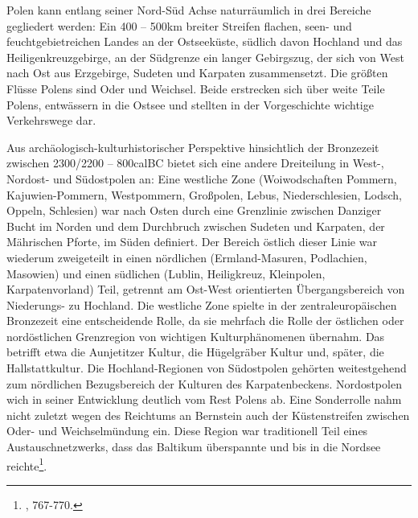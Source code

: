 \documentclass[openany,twoside,twocolumn]{book}
\let\rmarkdownfootnote\footnote%
\def\footnote{\protect\rmarkdownfootnote}
\begin{document}
Polen kann entlang seiner Nord-Süd Achse naturräumlich in drei Bereiche gegliedert werden: Ein 400 -- 500km breiter Streifen flachen, seen- und feuchtgebietreichen Landes an der Ostseeküste, südlich davon Hochland und das Heiligenkreuzgebirge, an der Südgrenze ein langer Gebirgszug, der sich von West nach Ost aus Erzgebirge, Sudeten und Karpaten zusammensetzt. Die größten Flüsse Polens sind Oder und Weichsel. Beide erstrecken sich über weite Teile Polens, entwässern in die Ostsee und stellten in der Vorgeschichte wichtige Verkehrswege dar.

Aus archäologisch-kulturhistorischer Perspektive hinsichtlich der Bronzezeit zwischen 2300/2200 -- 800calBC bietet sich eine andere Dreiteilung in West-, Nordost- und Südostpolen an: Eine westliche Zone (Woiwodschaften Pommern, Kajuwien-Pommern, Westpommern, Großpolen, Lebus, Niederschlesien, Lodsch, Oppeln, Schlesien) war nach Osten durch eine Grenzlinie zwischen Danziger Bucht im Norden und dem Durchbruch zwischen Sudeten und Karpaten, der Mährischen Pforte, im Süden definiert. Der Bereich östlich dieser Linie war wiederum zweigeteilt in einen nördlichen (Ermland-Masuren, Podlachien, Masowien) und einen südlichen (Lublin, Heiligkreuz, Kleinpolen, Karpatenvorland) Teil, getrennt am Ost-West orientierten Übergangsbereich von Niederungs- zu Hochland. Die westliche Zone spielte in der zentraleuropäischen Bronzezeit eine entscheidende Rolle, da sie mehrfach die Rolle der östlichen oder nordöstlichen Grenzregion von wichtigen Kulturphänomenen übernahm. Das betrifft etwa die Aunjetitzer Kultur, die Hügelgräber Kultur und, später, die Hallstattkultur. Die Hochland-Regionen von Südostpolen gehörten weitestgehend zum nördlichen Bezugsbereich der Kulturen des Karpatenbeckens. Nordostpolen wich in seiner Entwicklung deutlich vom Rest Polens ab. Eine Sonderrolle nahm nicht zuletzt wegen des Reichtums an Bernstein auch der Küstenstreifen zwischen Oder- und Weichselmündung ein. Diese Region war traditionell Teil eines Austauschnetzwerks, dass das Baltikum überspannte und bis in die Nordsee reichte\footnote{\textcite{czebreszuk_bronze_2013}, 767-770.}.
\end{document}
